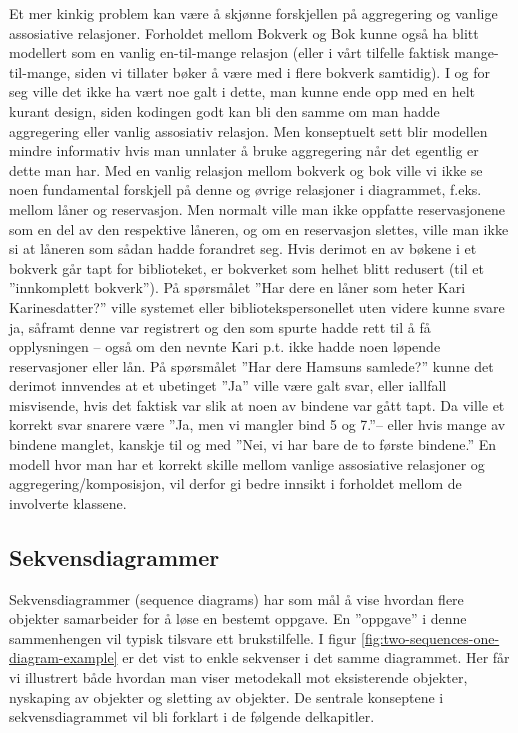 Et mer kinkig problem kan være å skjønne forskjellen på aggregering og vanlige assosiative relasjoner. Forholdet mellom Bokverk og Bok kunne også ha blitt modellert som en vanlig en-til-mange relasjon (eller i vårt tilfelle faktisk mange-til-mange, siden vi tillater bøker å være med i flere bokverk samtidig). I og for seg ville det ikke ha vært noe galt i dette, man kunne ende opp med en helt kurant design, siden kodingen godt kan bli den samme om man hadde aggregering eller vanlig assosiativ relasjon. Men konseptuelt sett blir modellen mindre informativ hvis man unnlater å bruke aggregering når det egentlig er dette man har. Med en vanlig relasjon mellom bokverk og bok ville vi ikke se noen fundamental forskjell på denne og øvrige relasjoner i diagrammet, f.eks. mellom låner og reservasjon. Men normalt ville man ikke oppfatte reservasjonene som en del av den respektive låneren, og om en reservasjon slettes, ville man ikke si at låneren som sådan hadde forandret seg. Hvis derimot en av bøkene i et bokverk går tapt for biblioteket, er bokverket som helhet blitt redusert (til et ”innkomplett bokverk”). På spørsmålet ”Har dere en låner som heter Kari Karinesdatter?” ville systemet eller bibliotekspersonellet uten videre kunne svare ja, såframt denne var registrert og den som spurte hadde rett til å få opplysningen – også om den nevnte Kari p.t. ikke hadde noen løpende reservasjoner eller lån. På spørsmålet ”Har dere Hamsuns samlede?” kunne det derimot innvendes at et ubetinget ”Ja” ville være galt svar, eller iallfall misvisende, hvis det faktisk var slik at noen av bindene var gått tapt. Da ville et korrekt svar snarere være ”Ja, men vi mangler bind 5 og 7.”– eller hvis mange av bindene manglet, kanskje til og med ”Nei, vi har bare de to første bindene.” En modell hvor man har et korrekt skille mellom vanlige assosiative relasjoner og aggregering/komposisjon, vil derfor gi bedre innsikt i forholdet mellom de involverte klassene.

\subsection{Sekvensdiagrammer}

Sekvensdiagrammer (sequence diagrams) har som mål å vise hvordan flere objekter samarbeider for å løse en bestemt oppgave. En ”oppgave” i denne sammenhengen vil typisk tilsvare ett brukstilfelle. I figur \ref{fig:two-sequences-one-diagram-example} er det vist to enkle sekvenser i det samme diagrammet. Her får vi illustrert både hvordan man viser metodekall mot eksisterende objekter, nyskaping av objekter og sletting av objekter. De sentrale konseptene i sekvensdiagrammet vil bli forklart i de følgende delkapitler.

